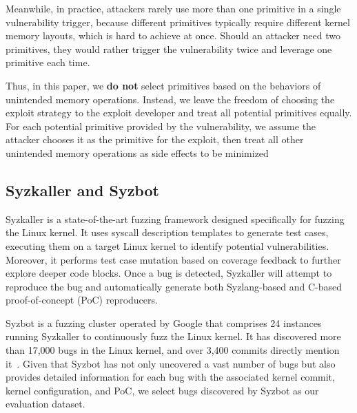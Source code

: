 Meanwhile, in practice, attackers rarely use more than one primitive in a single vulnerability trigger, because different primitives typically require different kernel memory layouts, which is hard to achieve at once. Should an attacker need two primitives, they would rather trigger the vulnerability twice and leverage one primitive each time.


Thus, in this paper, we \textbf{do not} select primitives based on the behaviors of unintended memory operations. Instead, we leave the freedom of choosing the exploit strategy to the exploit developer and treat all potential primitives equally. For each potential primitive provided by the vulnerability, we assume the attacker chooses it as the primitive for the exploit, then treat all other unintended memory operations as side effects to be minimized
\fi


\subsection{Syzkaller and Syzbot}
Syzkaller\cite{syzkaller} is a state-of-the-art fuzzing framework designed specifically for fuzzing the Linux kernel. It uses syscall description templates to generate test cases, executing them on a target Linux kernel to identify potential vulnerabilities. Moreover, it performs test case mutation based on coverage feedback to further explore deeper code blocks. Once a bug is detected, Syzkaller will attempt to reproduce the bug and automatically generate both Syzlang-based and C-based proof-of-concept (PoC) reproducers.

Syzbot\cite{syzbot} is a fuzzing cluster operated by Google that comprises 24 instances\cite{bursey2024syzretrospector} running Syzkaller to continuously fuzz the Linux kernel. It has discovered more than 17,000 bugs in the Linux kernel, and over 3,400 commits directly mention it~\cite{LinuxPlu99:online}. Given that Syzbot has not only uncovered a vast number of bugs but also provides detailed information for each bug with the associated kernel commit, kernel configuration, and PoC, we select bugs discovered by Syzbot as our evaluation dataset.

